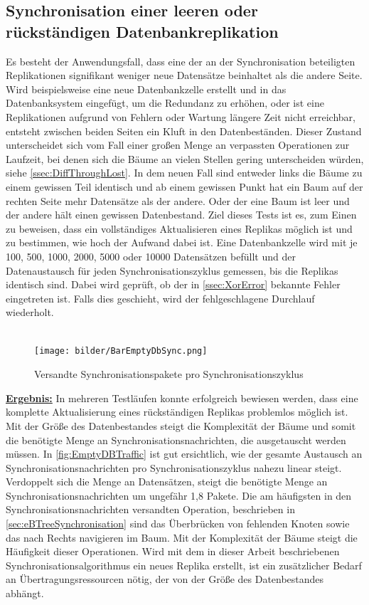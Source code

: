 \documentclass[a4paper,11pt,oneside,%
headsepline,												%
footsepline,												%
bibtotocnumbered									%
]{scrreprt}
\begin{document}
\subsection{Synchronisation einer leeren oder rückständigen Datenbankreplikation}
\label{ssec:EmptyDBTest}
Es besteht der Anwendungsfall, dass eine der an der Synchronisation beteiligten Replikationen signifikant weniger neue Datensätze beinhaltet als die andere Seite. Wird beispielsweise eine neue Datenbankzelle erstellt und in das Datenbanksystem eingefügt, um die Redundanz zu erhöhen, oder ist eine Replikationen aufgrund von Fehlern oder Wartung längere Zeit nicht erreichbar, entsteht zwischen beiden Seiten ein Kluft in den Datenbeständen. Dieser Zustand unterscheidet sich  vom Fall einer großen Menge an verpassten Operationen zur Laufzeit, bei denen sich die Bäume an vielen Stellen gering unterscheiden würden, siehe \autoref{ssec:DiffThroughLost}. In dem neuen Fall sind entweder links die Bäume zu einem gewissen Teil identisch und ab einem gewissen Punkt hat ein Baum auf der rechten Seite mehr Datensätze als der andere. Oder der eine Baum ist leer und der andere hält einen gewissen Datenbestand. Ziel dieses Tests ist es, zum Einen zu beweisen, dass ein vollständiges Aktualisieren eines Replikas möglich ist und zu bestimmen, wie hoch der Aufwand dabei ist. Eine Datenbankzelle wird mit je 100, 500, 1000, 2000, 5000 oder 10000 Datensätzen befüllt und der Datenaustausch für jeden Synchronisationszyklus gemessen, bis die Replikas identisch sind. Dabei wird geprüft, ob der in \autoref{ssec:XorError} bekannte Fehler eingetreten ist. Falls dies geschieht, wird der fehlgeschlagene Durchlauf wiederholt.\\\\
\begin{figure}[h!]
  \begin{center}
    \texttt{[image: bilder/BarEmptyDbSync.png]}
  \end{center}
 \caption{Versandte Synchronisationspakete pro Synchronisationszyklus}
  \label{fig:EmptyDBTraffic}
\end{figure}
\underline{{\bf Ergebnis:}} In mehreren Testläufen konnte erfolgreich bewiesen werden, dass eine komplette Aktualisierung eines rückständigen Replikas problemlos möglich ist. Mit der Größe des Datenbestandes steigt die Komplexität der Bäume und somit die benötigte Menge an Synchronisationsnachrichten, die ausgetauscht werden müssen. In \autoref{fig:EmptyDBTraffic} ist gut ersichtlich, wie der gesamte Austausch an Synchronisationsnachrichten pro Synchronisationszyklus nahezu linear steigt. Verdoppelt sich die Menge an Datensätzen, steigt die benötigte Menge an Synchronisationsnachrichten um ungefähr 1,8 Pakete. Die am häufigsten in den Synchronisationsnachrichten versandten Operation, beschrieben in \autoref{sec:eBTreeSynchronisation} sind das Überbrücken von fehlenden Knoten sowie das nach Rechts navigieren im Baum. Mit der Komplexität der Bäume steigt die Häufigkeit dieser Operationen. Wird mit dem in dieser Arbeit beschriebenen Synchronisationsalgorithmus ein neues Replika erstellt, ist ein zusätzlicher Bedarf an Übertragungsressourcen nötig, der  von der Größe des Datenbestandes abhängt.
\end{document}
